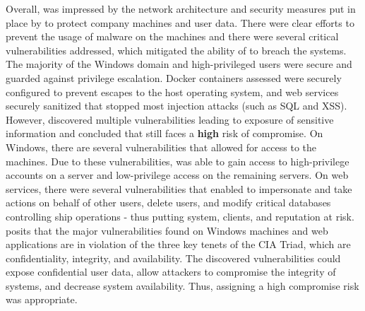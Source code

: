 Overall, \team was impressed by the network architecture and security measures put in place by \client to protect company machines and user data. There were clear efforts to prevent the usage of malware on the machines and there were several critical vulnerabilities addressed, which mitigated the ability of \team to breach the systems. The majority of the Windows domain and high-privileged users were secure and guarded against privilege escalation. Docker containers assessed were securely configured to prevent escapes to the host operating system, and web services securely sanitized that stopped most injection attacks (such as SQL and XSS). However, \team discovered multiple vulnerabilities leading to exposure of sensitive information and concluded that \client still faces a \textbf{high} risk of compromise.\bigskip
\bigskip
On Windows, there are several vulnerabilities that allowed for access to the machines. Due to these vulnerabilities, \team was able to gain access to high-privilege accounts on a server and low-privilege access on the remaining servers.\bigskip
\bigskip
On \clientP web services, there were several vulnerabilities that enabled \team to impersonate and take actions on behalf of other users, delete users, and modify critical databases controlling ship operations - thus putting \clientP system, clients, and reputation at risk.\bigskip
\bigskip
\team posits that the major vulnerabilities found on \clientP Windows machines and web applications are in violation of the three key tenets of the CIA Triad, which are confidentiality, integrity, and availability. The discovered vulnerabilities could expose confidential user data, allow attackers to compromise the integrity of \client systems, and decrease system availability. Thus, assigning \client a high compromise risk was appropriate.
